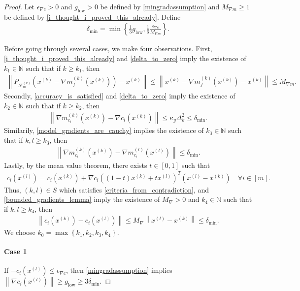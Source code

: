 \documentclass{article}
\theoremstyle{case}
\numberwithin{theorem}{subsection}
\newcommand{\dk}{\Delta_k}
\newcommand{\feasiblek}{{\mathcal F_m^{(k)}}}
\newcommand{\gk}{{\nabla m_f^{(k)}\left(\xk\right)}}
\newcommand{\gmcik}{{\nabla m_{c_i}^{(k)}\left(\xk\right)}}
\newcommand{\gmcil}{{\nabla m_{c_i}^{(l)}\left(\xl\right)}}
\newcommand{\maxgrad}{{M_{\nabla}}}
\newcommand{\mingradepsilon}{{\epsilon_{\nabla c}}}
\newcommand{\mingrad}{{ g_{\textrm{low}} }}
\newcommand{\naturals}{\mathbb N}
\newcommand{\xk}{x^{(k)}}
\newcommand{\xl}{{x^{(l)}}}
\newcommand{\maxmodelgrad}{{M_{\nabla m}}}
\newcommand{\deltalb}{{\delta_{\textrm{min}}}}
\begin{document}
\begin{proof}

Let $\mingradepsilon > 0$ and $\mingrad > 0$ be defined by \cref{mingradassumption}
and $\maxmodelgrad \ge 1$ be defined by \cref{i_thought_i_proved_this_already}.
Define
\begin{align*}
\deltalb = \min\left\{\frac 1 3 \mingrad, \frac 1 {6} \frac{\mingradepsilon}{\maxmodelgrad} \right\}.
\end{align*}

Before going through several cases, we make four observations.
First, \cref{i_thought_i_proved_this_already} and \cref{delta_to_zero} imply the existence of $k_1 \in \naturals$
such that if $k \ge k_1$, then
\begin{align*}
\left\|P_{\feasiblek}\left(\xk - \gk\right) - \xk\right\| 
\le \left\|\xk - \gk - \xk \right\| \le \maxmodelgrad.
\end{align*}
Secondly, \cref{accuracy_is_satisfied} and \cref{delta_to_zero} imply the existence of $k_2 \in \naturals$ such that if $k \ge k_2$, then
\begin{align}
\left\|\gmcik - \nabla c_i\left(\xk\right)\right\| \le \kappa_g \dk^2 \le \deltalb. \label{hmoydihtp_eqn1}
\end{align}
Similarily, \cref{model_gradients_are_cauchy} implies the existence of $k_3 \in \naturals$ such that if $k, l \ge k_3$, then 
\begin{align}
\left\|\gmcik - \gmcil\right\| \le \deltalb. \label{hmoydihtp_eqn2}
\end{align}
Lastly, by the mean value theorem, there exists $t \in [0, 1]$ such that
\begin{align*}
c_i\left(\xl\right) = c_i\left(\xk\right) + \nabla c_i\left((1 - t)\xk + t \xl\right)^T\left(\xl - \xk\right) \quad \forall i \in [m].
\end{align*}
Thus, $(k, l) \in S$ which satisfies \cref{criteria_from_contradiction}, and
\cref{bounded_gradients_lemma} imply the existence of $\maxgrad > 0$ and $k_4 \in \naturals$ such that if $k, l \ge k_4$, 
then
\begin{align}
\left\|c_i\left(\xk\right) - c_i\left(\xl\right) \right\| \le \maxgrad \left\|\xl - \xk\right\| \le \deltalb. \label{hmoydihtp_eqn3}
\end{align}
We choose $k_0 = \max\left\{k_1, k_2, k_3, k_4\right\}$.

\paragraph{Case 1}
If $-c_i\left(\xl\right) \le \mingradepsilon$, then \cref{mingradassumption} implies $\left\| \nabla c_i\left(\xl\right) \right\| \ge \mingrad \ge 3 \deltalb$.


\end{proof}
\end{document}
